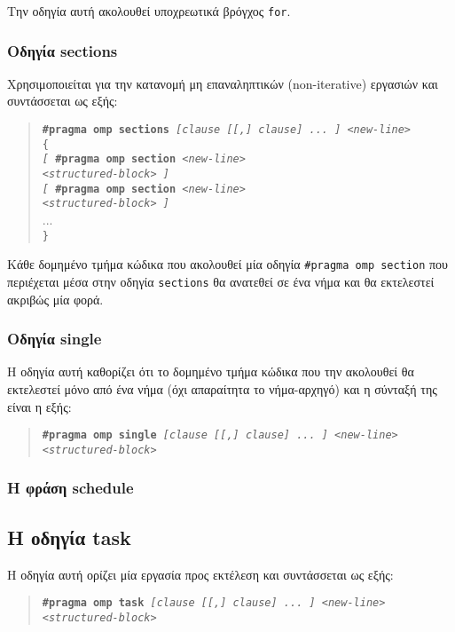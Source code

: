 Την οδηγία αυτή ακολουθεί υποχρεωτικά βρόγχος \texttt{for}.

\subsubsection{Οδηγία sections}
Χρησιμοποιείται για την κατανομή μη επαναληπτικών (non-iterative) εργασιών και συντάσσεται ως εξής:
\begin{quote}
	\texttt{\textbf{\#pragma omp sections} \textit{[clause [[,] clause] ... ] <new-line>}} \\
	\texttt{\{} \\
		\texttt{\textit{[} \textbf{\#pragma omp section} \textit{<new-line>}} \\
		\texttt{\textit{<structured-block> ]}} \\
		\texttt{\textit{[} \textbf{\#pragma omp section} \textit{<new-line>}} \\
		\texttt{\textit{<structured-block> ]}} \\
		... \\
	\texttt{\}}
\end{quote}

Κάθε δομημένο τμήμα κώδικα που ακολουθεί μία οδηγία \texttt{\#pragma omp section} που περιέχεται μέσα στην οδηγία \texttt{sections} θα ανατεθεί σε ένα νήμα και θα εκτελεστεί ακριβώς μία φορά.

\subsubsection{Οδηγία single}
Η οδηγία αυτή καθορίζει ότι το δομημένο τμήμα κώδικα που την ακολουθεί θα εκτελεστεί μόνο από ένα νήμα (όχι απαραίτητα το νήμα-αρχηγό) και η σύνταξή της είναι η εξής:
\begin{quote}
	\texttt{\textbf{\#pragma omp single} \textit{[clause [[,] clause] ... ] <new-line>}} \\
		\texttt{\textit{<structured-block>}}
\end{quote}

\subsubsection{Η φράση schedule}

\subsection{Η οδηγία task}
Η οδηγία αυτή ορίζει μία εργασία προς εκτέλεση και συντάσσεται ως εξής:
\begin{quote}
	\texttt{\textbf{\#pragma omp task} \textit{[clause [[,] clause] ... ] <new-line>}} \\
		\texttt{\textit{<structured-block>}}
\end{quote}

